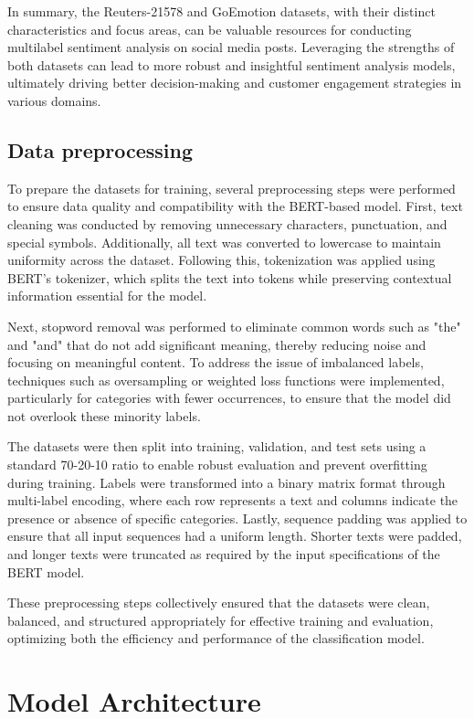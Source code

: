 \documentclass{article}
\begin{document}
In summary, the Reuters-21578 and GoEmotion datasets, with their distinct characteristics and focus areas, can be valuable resources for conducting multilabel sentiment analysis on social media posts. Leveraging the strengths of both datasets can lead to more robust and insightful sentiment analysis models, ultimately driving better decision-making and customer engagement strategies in various domains.

\subsection{Data preprocessing}
To prepare the datasets for training, several preprocessing steps were performed to ensure data quality and compatibility with the BERT-based model. First, text cleaning was conducted by removing unnecessary characters, punctuation, and special symbols. Additionally, all text was converted to lowercase to maintain uniformity across the dataset. Following this, tokenization was applied using BERT's tokenizer, which splits the text into tokens while preserving contextual information essential for the model.

Next, stopword removal was performed to eliminate common words such as "the" and "and" that do not add significant meaning, thereby reducing noise and focusing on meaningful content. To address the issue of imbalanced labels, techniques such as oversampling or weighted loss functions were implemented, particularly for categories with fewer occurrences, to ensure that the model did not overlook these minority labels.

The datasets were then split into training, validation, and test sets using a standard 70-20-10 ratio to enable robust evaluation and prevent overfitting during training. Labels were transformed into a binary matrix format through multi-label encoding, where each row represents a text and columns indicate the presence or absence of specific categories. Lastly, sequence padding was applied to ensure that all input sequences had a uniform length. Shorter texts were padded, and longer texts were truncated as required by the input specifications of the BERT model.

These preprocessing steps collectively ensured that the datasets were clean, balanced, and structured appropriately for effective training and evaluation, optimizing both the efficiency and performance of the classification model.

\section{Model Architecture}
\end{document}
